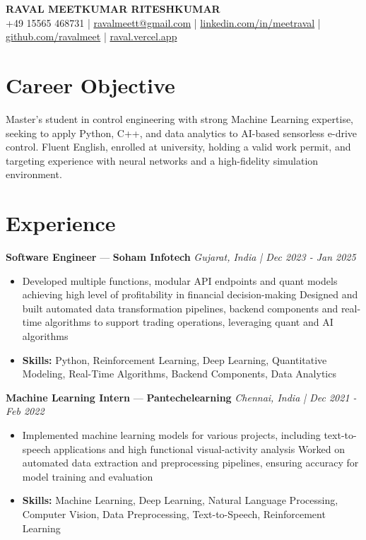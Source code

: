 \documentclass[a4paper,10pt]{article}
\begin{document}
\begin{center}
  {\Large\bfseries RAVAL MEETKUMAR RITESHKUMAR}\\[2pt]
  {\small +49 15565 468731 \;|\; \href{mailto:ravalmeett@gmail.com}{ravalmeett@gmail.com} \;|\; \href{https://www.linkedin.com/in/meetraval/}{linkedin.com/in/meetraval} \;|\; \href{https://github.com/ravalmeet}{github.com/ravalmeet} \;|\; \href{https://raval.vercel.app/}{raval.vercel.app}}
\end{center}
\vspace{-3pt}

\section*{Career Objective}
Master's student in control engineering with strong Machine Learning expertise, seeking to apply Python, C++, and data analytics to AI-based sensorless e-drive control. Fluent English, enrolled at university, holding a valid work permit, and targeting experience with neural networks and a high-fidelity simulation environment.\par

\section*{Experience}
\textbf{Software Engineer} — \textbf{Soham Infotech} \hfill \textit{Gujarat, India \;|\; Dec 2023 - Jan 2025}\par
\vspace{1pt}
\begin{itemize}
  \item Developed multiple functions, modular API endpoints and quant models achieving high level of profitability in financial decision-making Designed and built automated data transformation pipelines, backend components and real-time algorithms to support trading operations, leveraging quant and AI algorithms
  \item \textbf{Skills:} Python, Reinforcement Learning, Deep Learning, Quantitative Modeling, Real-Time Algorithms, Backend Components, Data Analytics
\end{itemize}
\vspace{3pt}
\textbf{Machine Learning Intern} — \textbf{Pantechelearning} \hfill \textit{Chennai, India \;|\; Dec 2021 - Feb 2022}\par
\vspace{1pt}
\begin{itemize}
  \item Implemented machine learning models for various projects, including text-to-speech applications and high functional visual-activity analysis Worked on automated data extraction and preprocessing pipelines, ensuring accuracy for model training and evaluation
  \item \textbf{Skills:} Machine Learning, Deep Learning, Natural Language Processing, Computer Vision, Data Preprocessing, Text-to-Speech, Reinforcement Learning
\end{itemize}
\end{document}
